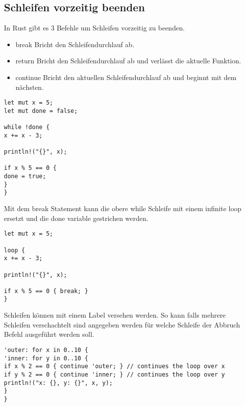 \subsection{Schleifen vorzeitig beenden}
In Rust gibt es 3 Befehle um Schleifen vorzeitig zu beenden.
\begin{itemize}
\item break
\subitem Bricht den Schleifendurchlauf ab.
\item return
\subitem Bricht den Schleifendurchlauf ab und verlässt die aktuelle Funktion.
\item continue
\subitem Bricht den aktuellen Schleifendurchlauf ab und beginnt mit dem nächsten.
\end{itemize}

\begin{lstlisting}
let mut x = 5;
let mut done = false;

while !done {
x += x - 3;

println!("{}", x);

if x % 5 == 0 {
done = true;
}
}
\end{lstlisting}

Mit dem break Statement kann die obere while Schleife mit einem infinite loop ersetzt und die done variable gestrichen werden.

\begin{lstlisting}
let mut x = 5;

loop {
x += x - 3;

println!("{}", x);

if x % 5 == 0 { break; }
}
\end{lstlisting}

Schleifen können mit einem Label versehen werden.
So kann falls mehrere Schleifen verschachtelt sind angegeben werden für welche Schleife der Abbruch Befehl ausgeführt werden soll.

\begin{lstlisting}
'outer: for x in 0..10 {
'inner: for y in 0..10 {
if x % 2 == 0 { continue 'outer; } // continues the loop over x
if y % 2 == 0 { continue 'inner; } // continues the loop over y
println!("x: {}, y: {}", x, y);
}
}
\end{lstlisting}